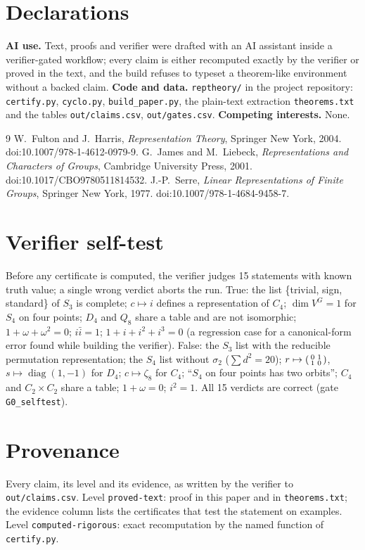 \documentclass[11pt]{article}
\theoremstyle{definition}
\theoremstyle{remark}
\begin{document}
\section*{Declarations}
\textbf{AI use.} Text, proofs and verifier were drafted with an AI assistant inside a verifier-gated workflow; every
claim is either recomputed exactly by the verifier or proved in the text, and the build refuses to typeset a
theorem-like environment without a backed claim. \textbf{Code and data.} \texttt{reptheory/} in the project repository:
\texttt{certify.py}, \texttt{cyclo.py}, \texttt{build\_paper.py}, the plain-text extraction \texttt{theorems.txt} and the
tables \texttt{out/claims.csv}, \texttt{out/gates.csv}. \textbf{Competing interests.} None.

\begin{thebibliography}{9}
 W.~Fulton and J.~Harris, \emph{Representation Theory}, Springer New York, 2004. doi:10.1007/978-1-4612-0979-9.
 G.~James and M.~Liebeck, \emph{Representations and Characters of Groups}, Cambridge University Press, 2001.
doi:10.1017/CBO9780511814532.
 J.-P.~Serre, \emph{Linear Representations of Finite Groups}, Springer New York, 1977.
doi:10.1007/978-1-4684-9458-7.
\end{thebibliography}

\appendix
\section{Verifier self-test}
Before any certificate is computed, the verifier judges 15 statements with known truth value; a single wrong verdict
aborts the run. True: the list \{trivial, sign, standard\} of $S_3$ is complete; $c\mapsto i$ defines a representation of
$C_4$; $\dim V^G=1$ for $S_4$ on four points; $D_4$ and $Q_8$ share a table and are not isomorphic; $1+\omega+\omega^2=0$;
$i\bar i=1$; $1+i+i^2+i^3=0$ (a regression case for a canonical-form error found while building the verifier). False:
the $S_3$ list with the reducible permutation representation; the $S_4$ list without $\sigma_2$ ($\sum d^2=20$);
$r\mapsto\begin{psmallmatrix}0&1\\1&0\end{psmallmatrix}$, $s\mapsto\operatorname{diag}(1,-1)$ for $D_4$; $c\mapsto\zeta_8$ for $C_4$;
``$S_4$ on four points has two orbits''; $C_4$ and $C_2\times C_2$ share a table; $1+\omega=0$; $i^2=1$. All 15 verdicts
are correct (gate \texttt{G0\_selftest}).

\section{Provenance}\label{app:prov}
Every claim, its level and its evidence, as written by the verifier to \texttt{out/claims.csv}. Level
\texttt{proved-text}: proof in this paper and in \texttt{theorems.txt}; the evidence column lists the certificates that test
the statement on examples. Level \texttt{computed-rigorous}: exact recomputation by the named function of \texttt{certify.py}.

\end{document}
